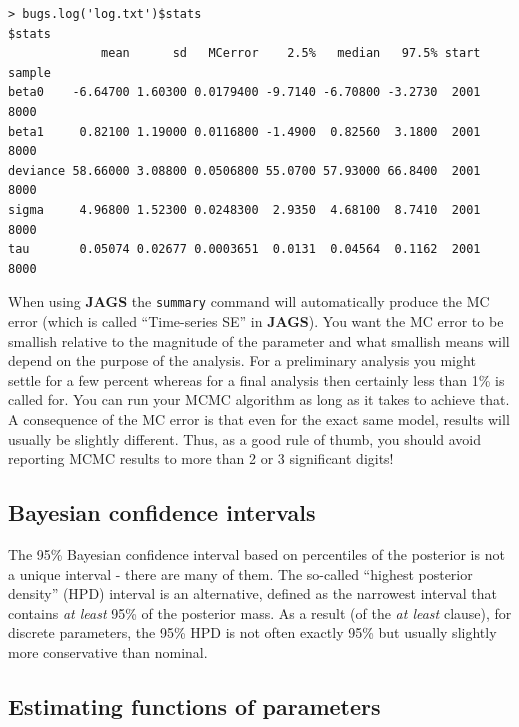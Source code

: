 {\small
\begin{verbatim}
> bugs.log('log.txt')$stats
$stats
             mean      sd   MCerror    2.5%   median   97.5% start sample
beta0    -6.64700 1.60300 0.0179400 -9.7140 -6.70800 -3.2730  2001   8000
beta1     0.82100 1.19000 0.0116800 -1.4900  0.82560  3.1800  2001   8000
deviance 58.66000 3.08800 0.0506800 55.0700 57.93000 66.8400  2001   8000
sigma     4.96800 1.52300 0.0248300  2.9350  4.68100  8.7410  2001   8000
tau       0.05074 0.02677 0.0003651  0.0131  0.04564  0.1162  2001   8000
\end{verbatim}
}
  When using {\bf JAGS} the \mbox{\tt summary} command will automatically produce the MC error (which is called ``Time-series SE'' in {\bf
  JAGS}). You want the MC error to be smallish relative to the magnitude of
the parameter and what smallish means will depend on the purpose of
the analysis. For a preliminary analysis you might settle for a few
percent whereas for a final analysis then certainly less than 1\% is
called for. You can run your MCMC algorithm as long as it takes to
achieve that. A consequence of the MC error is that even for the exact
same model, results will usually be slightly different. Thus, as a good rule of
thumb, you should avoid reporting MCMC results to more than 2 or 3
significant digits!

\subsection{Bayesian confidence intervals}

The 95\% Bayesian confidence interval based on percentiles of the
posterior is not a unique interval - there are many of them. The 
so-called ``highest posterior density'' (HPD) interval is an
alternative, defined as the
narrowest interval that contains {\it at least} 95\% of the posterior
mass.  As a result (of the {\it at least} clause), for discrete
parameters, the 95\% HPD is not often exactly 95\% but usually
slightly more conservative than nominal.

\subsection{Estimating functions of parameters}

